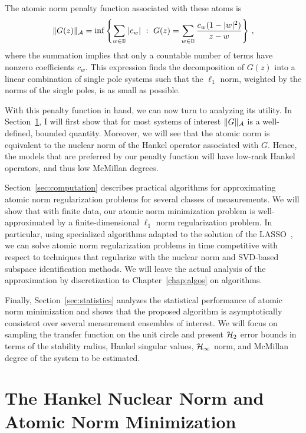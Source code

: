The atomic norm penalty function associated with these atoms is 
\begin{equation}\label{eq:atomic-def}
	\| G(z) \|_{\mathcal{A}} = \inf \left\{ \sum_{w\in \mathbb{D}} |c_w| ~:~ G(z) = \sum_{w\in\mathbb{D}} \frac{c_w (1-|w|^2)}{z-w}\right\}\,,
\end{equation}
where the summation implies that only a countable number of terms have nonzero
coefficients $c_w$. This expression finds the decomposition of $G(z)$ into a
linear combination of single pole systems such that the $\ell_1$ norm, weighted
by the norms of the single poles, is as small as possible.

With this penalty function in hand, we can now turn to analyzing its utility. In
Section~\ref{sec:hankel}, I will first show that for most systems of interest
$\|G\|_{\mathcal{A}}$ is a well-defined, bounded quantity. Moreover, we will see that
the atomic norm is equivalent to the nuclear norm of the Hankel operator
associated with $G$. Hence, the models that are preferred by our penalty
function will have low-rank Hankel operators, and thus low McMillan degrees.

Section~\ref{sec:computation} describes practical algorithms for approximating
atomic norm regularization problems for several classes of measurements. We will
show that with finite data, our atomic norm minimization problem is
well-approximated by a finite-dimensional $\ell_1$ norm regularization problem.
In particular, using specialized algorithms adapted to the solution of the
LASSO~\cite{wright09}, we can solve atomic norm regularization problems in time
competitive with respect to techniques that regularize with the nuclear norm and
SVD-based subspace identification methods. We will leave the actual analysis of
the approximation by discretization to Chapter~\ref{chap:algos} on algorithms.

Finally, Section~\ref{sec:statistics} analyzes the statistical performance of
atomic norm minimization and shows that the proposed algorithm is asymptotically
consistent over several measurement ensembles of interest. We will focus on
sampling the transfer function on the unit circle and present $\mathcal{H}_2$ error
bounds in terms of the stability radius, Hankel singular values, $\mathcal{H}_{\infty}$
norm, and McMillan degree of the system to be estimated.

\section{The Hankel Nuclear Norm and Atomic Norm Minimization}\label{sec:hankel}

